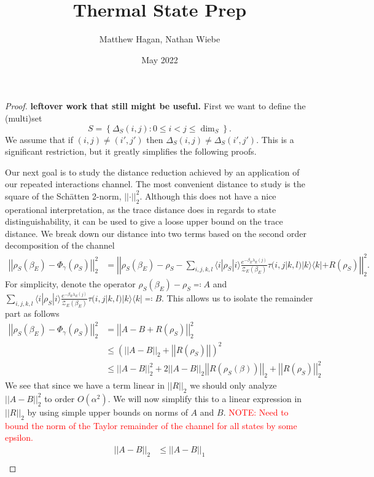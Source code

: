 \documentclass{article}
\title{Thermal State Prep}
\author{Matthew Hagan, Nathan Wiebe}
\date{May 2022}
\newcommand{\ket}[1]{|#1\rangle}
\newcommand{\bra}[1]{\langle #1|}
\newcommand{\ketbra}[2]{| #1\rangle\! \langle #2|}
\newcommand{\parens}[1]{\left( #1 \right)}
\newcommand{\norm}[1]{\left| \left| #1 \right| \right|}
\newcommand{\set}[1]{\left\{ #1 \right\}}
\newcommand{\bigo}[1]{O\left( #1 \right)}
\newcommand{\partfun}{\mathcal{Z}}
\begin{document}
\begin{proof}
    \textbf{leftover work that still might be useful.}
        First we want to define the (multi)set
        \begin{equation}
            S = \set{\Delta_S(i,j) : 0 \leq i < j \leq \dim_S}.
        \end{equation}
        We assume that if $(i,j) \neq (i', j')$ then $\Delta_S(i,j) \neq \Delta_S(i', j')$. This is a significant restriction, but it greatly simplifies the following proofs. 
        
        Our next goal is to study the distance reduction achieved by an application of our repeated interactions channel. The most convenient distance to study is the square of the Sch\"{a}tten 2-norm, $\norm{\cdot}_2^2$. Although this does not have a nice operational interpretation, as the trace distance does in regards to state distinguishability, it can be used to give a loose upper bound on the trace distance. We break down our distance into two terms based on the second order decomposition of the channel
    \begin{align}
        \norm{\rho_S(\beta_E) - \Phi_{\gamma}(\rho_S)}_2^2 &= \norm{\rho_S(\beta_E) - \rho_S - \sum_{i, j, k, l} \bra{i} \rho_S \ket{i} \frac{e^{-\beta_E \lambda_E(j)}}{\partfun_E(\beta_E)}   \tau(i, j| k,l) \ketbra{k}{k} + R(\rho_S)}_2^2.
    \end{align}
    For simplicity, denote the operator $\rho_S(\beta_E) - \rho_S \eqqcolon A$ and $\sum_{i, j, k, l} \bra{i} \rho_S \ket{i} \frac{e^{-\beta_E \lambda_E(j)}}{\partfun_E(\beta_E)} \tau(i, j| k,l) \ketbra{k}{k} \eqqcolon B$. This allows us to isolate the remainder part as follows
    \begin{align}
        \norm{\rho_S(\beta_E) - \Phi_\gamma(\rho_S)}_2^2 &= \norm{A - B + R(\rho_S)}_2^2 \\
        &\leq \parens{\norm{A - B}_2 + \norm{R(\rho_S)}}^2 \\
        &\leq \norm{A - B}_2^2 + 2 \norm{A - B}_2 \norm{R(\rho_S(\beta))}_2 + \norm{R(\rho_S)}_2^2
    \end{align}
    We see that since we have a term linear in $\norm{R}_2$ we should only analyze $\norm{A - B}_2^2$ to order $\bigo{\alpha^2}$. We will now simplify this to a linear expression in $\norm{R}_2$ by using simple upper bounds on norms of $A$ and $B$. \textcolor{red}{NOTE: Need to bound the norm of the Taylor remainder of the channel for all states by some epsilon.} 
    \begin{align}
        \norm{A - B}_2 &\leq \norm{A - B}_1 \\

\end{align}
\end{proof}
\end{document}

